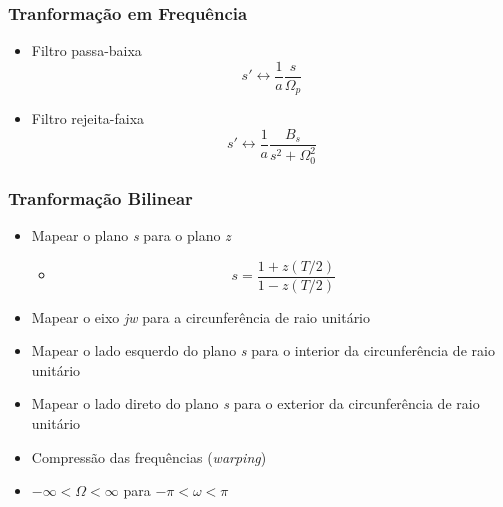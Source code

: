 \documentclass{beamer}
\begin{document}
\subsubsection{Tranforma\c{c}\~ao em Frequ\^encia}
	\begin{frame}
		\begin{itemize}
		 \item Filtro passa-baixa
			  \begin{equation}
			  s' \leftrightarrow \frac{1}{a} \frac{s}{\Omega_{p}}
			  \end{equation}
		 \item Filtro rejeita-faixa
			  \begin{equation}
			  s' \leftrightarrow \frac{1}{a} \frac{B_{s}}{s^{2} + \Omega_{0}^{2}}
			  \end{equation}
		\end{itemize}

	\end{frame}
	
\subsubsection{Tranforma\c{c}\~ao Bilinear}

	\begin{frame}
		\begin{itemize}
			\item Mapear o plano \textit{s} para o plano \textit{z}
				\begin{itemize}
				\item  		\[s = \frac{1+z(T/2)}{1-z(T/2)}\]
				\end{itemize}
			\item Mapear o eixo \textit{jw} para a circunfer\^encia de raio unit\'ario
			\item Mapear o lado esquerdo do plano \textit{s} para o interior da circunfer\^encia de raio unit\'ario
			\item Mapear o lado direto do plano \textit{s} para o exterior da circunfer\^encia de raio unit\'ario
			\item Compress\~ao das frequ\^encias (\textit{warping})
			\item \(-\infty < \Omega < \infty\) para \(-\pi < \omega < \pi\)
		\end{itemize}

	\end{frame}
	
\end{document}
